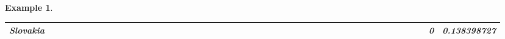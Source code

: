 \documentclass[a4paper,11pt]{report}
\newtheorem{example}[theorem]{Example}
\begin{document}
\begin{example}
\begin{appendices}
\begin{landscape}
\begin{longtable}{r|r|r|r|r|r|r|r|r|r|r|r|r|r|r|r|r|r|r|r|r|r|r|r|r|r|r|r|r|r|r|r|r|r|r|r|r|r|r|r|r|r|r|r|r|r|r|}
\multicolumn{1}{|r|}{\textbf{Slovakia}}              &                                       &                                       &                                          &                                       &                                       &                                                     &                                        &                                       &                                      &                                       &                                       &                                                &                                       &                                      &                                       &                                       &                                      &                                       &                                       &                                       &                                      &                                     &                                      &                                         &                                     &                                       &                                          &                                      &                                        &                                       &                                      &                                          &                                      &                                        &                                        &                                     &                                      &                                           &                                               &                                      &                                       &                                              &                                      &                                     & 0                                             & 0.138398727                             \\ \hline

\end{longtable}
\end{landscape}
\end{appendices}
\end{example}
\end{document}
